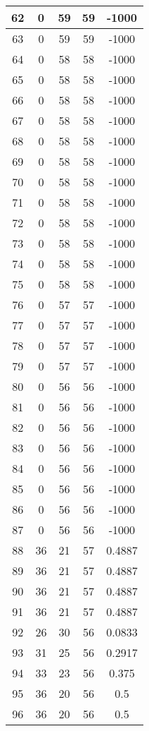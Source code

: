 \documentclass[letterpaper, 12pt]{article}
\begin{document}
\begin{longtable}{|c|c|c|c|c|}
\hline
62 & 0 & 59 & 59 & -1000 \\
\hline
63 & 0 & 59 & 59 & -1000 \\
\hline
64 & 0 & 58 & 58 & -1000 \\
\hline
65 & 0 & 58 & 58 & -1000 \\
\hline
66 & 0 & 58 & 58 & -1000 \\
\hline
67 & 0 & 58 & 58 & -1000 \\
\hline
68 & 0 & 58 & 58 & -1000 \\
\hline
69 & 0 & 58 & 58 & -1000 \\
\hline
70 & 0 & 58 & 58 & -1000 \\
\hline
71 & 0 & 58 & 58 & -1000 \\
\hline
72 & 0 & 58 & 58 & -1000 \\
\hline
73 & 0 & 58 & 58 & -1000 \\
\hline
74 & 0 & 58 & 58 & -1000 \\
\hline
75 & 0 & 58 & 58 & -1000 \\
\hline
76 & 0 & 57 & 57 & -1000 \\
\hline
77 & 0 & 57 & 57 & -1000 \\
\hline
78 & 0 & 57 & 57 & -1000 \\
\hline
79 & 0 & 57 & 57 & -1000 \\
\hline
80 & 0 & 56 & 56 & -1000 \\
\hline
81 & 0 & 56 & 56 & -1000 \\
\hline
82 & 0 & 56 & 56 & -1000 \\
\hline
83 & 0 & 56 & 56 & -1000 \\
\hline
84 & 0 & 56 & 56 & -1000 \\
\hline
85 & 0 & 56 & 56 & -1000 \\
\hline
86 & 0 & 56 & 56 & -1000 \\
\hline
87 & 0 & 56 & 56 & -1000 \\
\hline
88 & 36 & 21 & 57 & 0.4887 \\
\hline
89 & 36 & 21 & 57 & 0.4887 \\
\hline
90 & 36 & 21 & 57 & 0.4887 \\
\hline
91 & 36 & 21 & 57 & 0.4887 \\
\hline
92 & 26 & 30 & 56 & 0.0833 \\
\hline
93 & 31 & 25 & 56 & 0.2917 \\
\hline
94 & 33 & 23 & 56 & 0.375 \\
\hline
95 & 36 & 20 & 56 & 0.5 \\
\hline
96 & 36 & 20 & 56 & 0.5 \\

\end{longtable}
\end{document}
